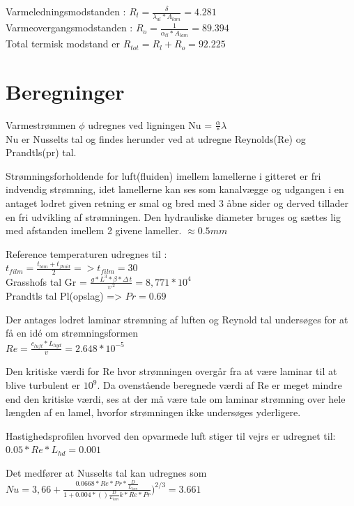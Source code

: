 Varmeledningsmodstanden : $R_l = \frac{\delta}{\lambda_{al}*A_{lam}} = 4.281$ \\
Varmeovergangsmodstanden : $R_o = \frac{1}{\alpha_{tl}*A_{lam}} = 89.394$ \\

Total termisk modstand er $R_{tot} = R_l + R_o = 92.225$ \\

\section{Beregninger}

Varmestrømmen $\phi$ udregnes ved ligningen Nu = $\frac{\alpha}*{\lambda}$ \\
Nu er Nusselts tal og findes herunder ved at udregne Reynolds(Re) og Prandtls(pr) tal.

Strømningsforholdende for luft(fluiden) imellem lamellerne i gitteret er fri indvendig strømning, idet lamellerne kan ses som kanalvægge og udgangen i en antaget lodret given retning er smal og bred med 3 åbne sider og derved tillader en fri udvikling af strømningen. Den hydrauliske diameter bruges og sættes lig med afstanden imellem 2 givene lameller. $\approx 0.5 mm$

Reference temperaturen udregnes til : 
\\$t_{film} = \frac{{t_{lam}}+t_{fluid}}{2} => t_{film}=30$
\\Grasshofs tal Gr = $\frac{g*L^3*\beta*{\Delta\,t}}{\upsilon\,^2} = 8,771*10^4$
\\Prandtls tal Pl(opslag) => $Pr=0.69$

Der antages lodret laminar strømning af luften og Reynold tal undersøges for at få en idé om strømningsformen\\

$Re = \frac{c_{luft}*L_{hyd}}{\upsilon} = 2.648*10^{-5}$

Den kritiske værdi for Re hvor strømningen overgår fra at være laminar til at blive turbulent er $10^9$.  Da ovenstående beregnede værdi af Re er meget mindre end den kritiske værdi, ses at der må være tale om laminar strømning over hele længden af en lamel, hvorfor strømningen ikke undersøges yderligere.

Hastighedsprofilen hvorved den opvarmede luft stiger til vejrs er udregnet til: 
$0.05*Re*L_{hd} = 0.001 $

Det medfører at Nusselts tal kan udregnes som \\ 
$Nu = 3,66+ \frac{0.0668*Re*Pr*\frac{D}{L_{lam}}}{1+0.004*()\frac{D}{L_{lam}}k *Re*Pr})^{2/3} = 3.661$



